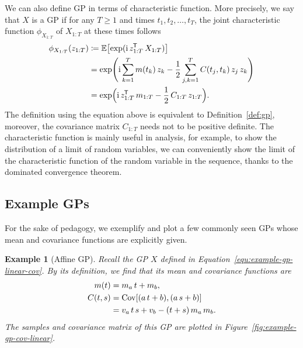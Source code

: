 \documentclass[]{article}
\newtheorem{example}[theorem]{Example}
\begin{document}
We can also define GP in terms of characteristic function. More precisely, we say that $X$ is a GP if for any $T\geq 1$ and times $t_1, t_2, \ldots, t_T$, the joint characteristic function $\phi_{X_{1:T}}$ of $X_{1:T}$ at these times follows
%
\begin{equation}
	\begin{split}
		\phi_{X_{1:T}}(z_{1:T}) &\coloneqq \operatorname{\mathbb{E}} \bigl[ \exp(\mathrm{i} \, z_{1:T}^{\mkern-1.5mu\mathsf{T}} \, X_{1:T}) \bigr]\\
		&= \exp\Biggl(\mathrm{i} \sum^T_{k=1} m(t_k) \, z_k - \frac{1}{2} \sum^T_{j,k=1} C(t_j, t_k) \, z_j \, z_k \Biggr)  \\
		&= \exp \Bigl( \mathrm{i} \, z_{1:T}^{\mkern-1.5mu\mathsf{T}} \, m_{1:T} - \frac{1}{2} \, C_{1:T} \, z_{1:T} \Bigr).
	\end{split}
	\label{equ:gp-characteristic-func}
\end{equation}
%
The definition using the equation above is equivalent to Definition~\ref{def:gp}, moreover, the covariance matrix $C_{1:T}$ needs not to be positive definite. The characteristic function is mainly useful in analysis, for example, to show the distribution of a limit of random variables, we can conveniently show the limit of the characteristic function of the random variable in the sequence, thanks to the dominated convergence theorem.

\subsection{Example GPs}

For the sake of pedagogy, we exemplify and plot a few commonly seen GPs whose mean and covariance functions are explicitly given.

\begin{example}[Affine GP]
	\label{example:affine-gp}
	Recall the GP $X$ defined in Equation~\eqref{equ:example-gp-linear-cov}. By its definition, we find that its mean and covariance functions are 
	\begin{equation}
		\begin{split}
			m(t) &= m_a \, t + m_b, \\
			C(t, s) &= \cov{(a \, t + b), (a \, s + b)} \\
			&= v_a \, t \, s + v_b - (t + s) \, m_a \, m_b.
			\label{equ:affine-gp-mean-cov}
		\end{split}
	\end{equation}
	The samples and covariance matrix of this GP are plotted in Figure~\ref{fig:example-gp-cov-linear}.
\end{example}
\end{document}
